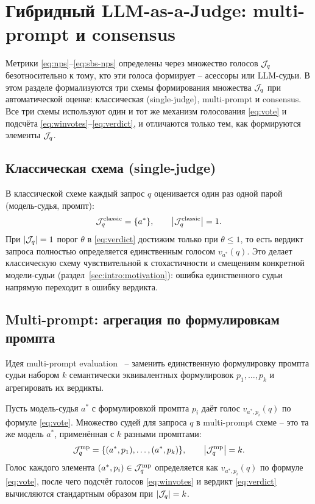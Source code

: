 \section{Гибридный LLM-as-a-Judge: multi-prompt и consensus}
\label{sec:method:hybrid}

Метрики \eqref{eq:nps}--\eqref{eq:sbs-nps} определены через множество
голосов $\mathcal{J}_q$ безотносительно к тому, кто эти голоса формирует --
асессоры или LLM-судьи.
В этом разделе формализуются три схемы формирования множества
$\mathcal{J}_q$ при автоматической оценке: классическая (single-judge),
multi-prompt и consensus.
Все три схемы используют один и тот же механизм голосования
\eqref{eq:vote} и подсчёта \eqref{eq:winvotes}--\eqref{eq:verdict}, и
отличаются только тем, как формируются элементы $\mathcal{J}_q$.

\subsection{Классическая схема (single-judge)}

В классической схеме каждый запрос $q$ оценивается один раз одной
парой (модель-судья, промпт):
\begin{equation}
    \label{eq:classic-judge}
    \mathcal{J}_q^{\mathrm{classic}} = \{ a^* \}, \qquad
    \left\lvert\mathcal{J}_q^{\mathrm{classic}}\right\rvert = 1.
\end{equation}
При $\left\lvert\mathcal{J}_q\right\rvert = 1$ порог $\theta$ в \eqref{eq:verdict} достижим
только при $\theta \le 1$, то есть вердикт запроса полностью определяется
единственным голосом $v_{a^*}(q)$.
Это делает классическую схему чувствительной к стохастичности и
смещениям конкретной модели-судьи (раздел~\ref{sec:intro:motivation}):
ошибка единственного судьи напрямую переходит в ошибку вердикта.

\subsection{Multi-prompt: агрегация по формулировкам промпта}
\label{sec:method:hybrid:multiprompt}

Идея multi-prompt evaluation~\cite{mizrahi2024stateofwhatart} -- заменить
единственную формулировку промпта судьи набором $k$ семантически
эквивалентных формулировок $p_1, \dots, p_k$ и агрегировать их вердикты.

Пусть модель-судья $a^*$ с формулировкой промпта $p_i$ даёт голос
$v_{a^*, p_i}(q)$ по формуле \eqref{eq:vote}.
Множество судей для запроса $q$ в multi-prompt схеме -- это та же модель
$a^*$, применённая с $k$ разными промптами:
\begin{equation}
    \label{eq:multiprompt-judges}
    \mathcal{J}_q^{\mathrm{mp}} = \{ (a^*, p_1), \dots, (a^*, p_k) \}, \qquad
    \left\lvert\mathcal{J}_q^{\mathrm{mp}}\right\rvert = k.
\end{equation}
Голос каждого элемента $(a^*, p_i) \in \mathcal{J}_q^{\mathrm{mp}}$
определяется как $v_{a^*, p_i}(q)$ по формуле \eqref{eq:vote}, после чего
подсчёт голосов \eqref{eq:winvotes} и вердикт \eqref{eq:verdict}
вычисляются стандартным образом при $\left\lvert\mathcal{J}_q\right\rvert = k$.

